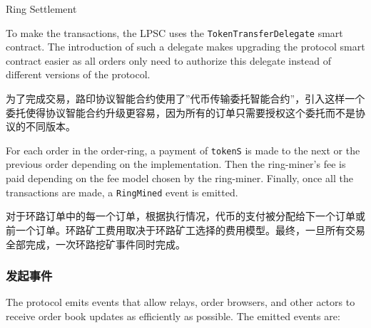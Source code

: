 \documentclass[UTF8,nofonts]{ctexart}
\makeatletter
\newenvironment{figurehere}
 {\def\@captype{figure}}
 {}
\makeatother
\begin{document}
\begin{multicols}{2}
\begin{center}
\begin{figurehere}
\caption{Ring Settlement}
\label{fig:settlement}
\end{figurehere}
\end{center}

To make the transactions, the LPSC uses the \verb|TokenTransferDelegate| smart contract. The introduction of such a delegate makes upgrading the protocol smart contract easier as all orders only need to authorize this delegate instead of different versions of the protocol.

为了完成交易，路印协议智能合约使用了”代币传输委托智能合约”，引入这样一个委托使得协议智能合约升级更容易，因为所有的订单只需要授权这个委托而不是协议的不同版本。


For each order in the order-ring, a payment of \verb|tokenS| is made to the next or the previous order depending on the implementation. Then the ring-miner's fee is paid depending on the fee model chosen by the ring-miner. Finally, once all the transactions are made, a \verb|RingMined| event is emitted.

对于环路订单中的每一个订单，根据执行情况，代币的支付被分配给下一个订单或前一个订单。环路矿工费用取决于环路矿工选择的费用模型。最终，一旦所有交易全部完成，一次环路挖矿事件同时完成。


\subsubsection{发起事件\label{sec:events}}

The protocol emits events that allow relays, order browsers, and other actors to receive order book updates as efficiently as possible. The emitted events are:


\end{multicols}
\end{document}

